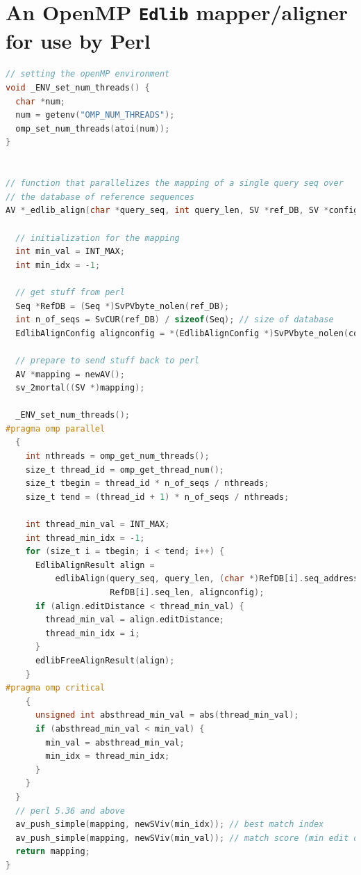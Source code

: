 \documentclass[10pt]{article}
\begin{document}
\section{An OpenMP \texttt{Edlib} mapper/aligner for use by Perl}\label{apndx:OMPAlignment}
\noindent\hspace{0.00\linewidth}\begin{minipage}{1\textwidth}
\begin{lstlisting}[language=C,basicstyle=\footnotesize,frame=single,caption={Query alignment, mapping and OpenMP environment reading in C},label={lst:OMPAlignment},captionpos=b]
// setting the openMP environment
void _ENV_set_num_threads() {
  char *num;
  num = getenv("OMP_NUM_THREADS");
  omp_set_num_threads(atoi(num));
}


// function that parallelizes the mapping of a single query seq over
// the database of reference sequences
AV *_edlib_align(char *query_seq, int query_len, SV *ref_DB, SV *config) {

  // initialization for the mapping
  int min_val = INT_MAX;
  int min_idx = -1;

  // get stuff from perl
  Seq *RefDB = (Seq *)SvPVbyte_nolen(ref_DB);
  int n_of_seqs = SvCUR(ref_DB) / sizeof(Seq); // size of database
  EdlibAlignConfig alignconfig = *(EdlibAlignConfig *)SvPVbyte_nolen(config);

  // prepare to send stuff back to perl
  AV *mapping = newAV();
  sv_2mortal((SV *)mapping);

  _ENV_set_num_threads();
#pragma omp parallel
  {
    int nthreads = omp_get_num_threads();
    size_t thread_id = omp_get_thread_num();
    size_t tbegin = thread_id * n_of_seqs / nthreads;
    size_t tend = (thread_id + 1) * n_of_seqs / nthreads;

    int thread_min_val = INT_MAX;
    int thread_min_idx = -1;
    for (size_t i = tbegin; i < tend; i++) {
      EdlibAlignResult align =
          edlibAlign(query_seq, query_len, (char *)RefDB[i].seq_address,
                     RefDB[i].seq_len, alignconfig);
      if (align.editDistance < thread_min_val) {
        thread_min_val = align.editDistance;
        thread_min_idx = i;
      }
      edlibFreeAlignResult(align);
    }
#pragma omp critical
    {
      unsigned int absthread_min_val = abs(thread_min_val);
      if (absthread_min_val < min_val) {
        min_val = absthread_min_val;
        min_idx = thread_min_idx;
      }
    }
  }
  // perl 5.36 and above
  av_push_simple(mapping, newSViv(min_idx)); // best match index
  av_push_simple(mapping, newSViv(min_val)); // match score (min edit distance)
  return mapping;
}

\end{lstlisting}
\end{minipage}
\end{document}
